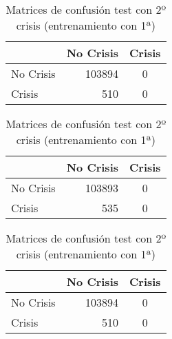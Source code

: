 \begin{table}
\begin{center}
\begin{subtable}[c]{0.4\textwidth}
\begin{tabular}{lrc}
                 & No Crisis & Crisis \\
                \hline
                No Crisis & 103894 & 0 \\
                Crisis & 510 & 0\\
                \hline
            \end{tabular}
            \label{tab:mat-conf-stats-1.7}
        \end{subtable}
        \begin{subtable}[c]{0.4\textwidth}
            \begin{tabular}{lrc}
                \hline
                 & No Crisis & Crisis \\
                \hline
                No Crisis & 103893 & 0 \\
                Crisis & 535 & 0\\
                \hline
            \end{tabular}
            \label{tab:mat-conf-raw-1.7}
        \end{subtable}
        \hspace{1em}\vspace{1em}
        \begin{subtable}[c]{0.4\textwidth}
                \begin{tabular}{lrc}
                \hline
                 & No Crisis & Crisis \\
                \hline
                No Crisis & 103894 & 0 \\
                Crisis & 510 & 0\\
                \hline
            \end{tabular}
            \label{tab:mat-conf-stats-1.8}
        \end{subtable}
        \caption{Matrices de confusión test con 2º crisis (entrenamiento con 1ª)}
        \label{tab:matriz-test-2a}
    \end{center}
\end{table}

